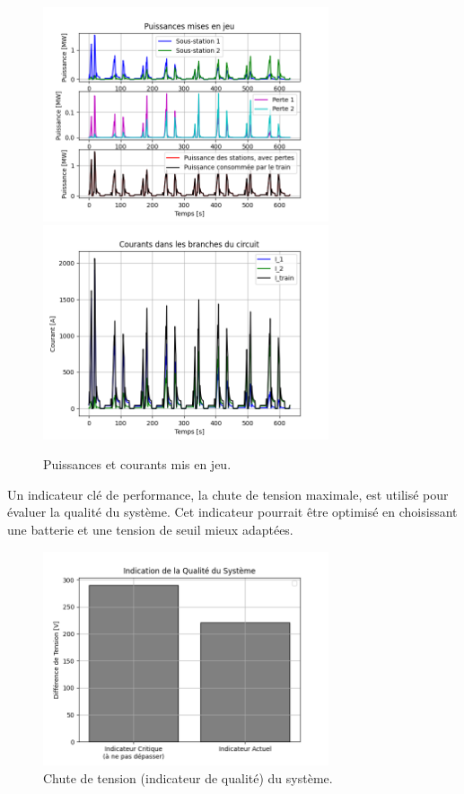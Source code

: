 \documentclass[11pt, a4paper, oneside, portrait]{report}
\begin{document}
            \begin{figure}[H]
                \centering
                \includegraphics[width=0.75\textwidth]{Figures/P.png}
                \includegraphics[width=0.75\textwidth]{Figures/I.png}
                \caption{Puissances et courants mis en jeu.}
                \label{fig:PI}
            \end{figure}

            Un indicateur clé de performance, la chute de tension maximale, est utilisé pour évaluer la qualité
            du système. Cet indicateur pourrait être optimisé en choisissant une batterie et une tension de
            seuil mieux adaptées.

            \begin{figure}[H]
                \centering
                \includegraphics[width=0.75\textwidth]{Figures/Qual.png}
                \caption{Chute de tension (indicateur de qualité) du système.}
                \label{fig:Qual}
            \end{figure}
\end{document}
